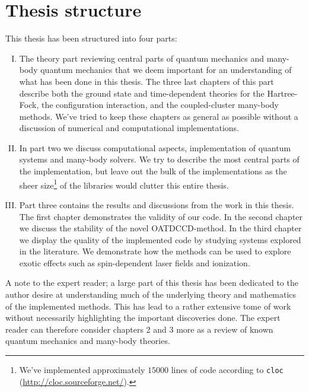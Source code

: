     \section{Thesis structure}
        This thesis has been structured into four parts:
        \begin{enumerate}[I.]
            \item The theory part reviewing central parts of quantum mechanics
                and many-body quantum mechanics that we deem important for an
                understanding of what has been done in this thesis.
                The three last chapters of this part describe both the ground
                state and time-dependent theories for the Hartree-Fock, the
                configuration interaction, and the coupled-cluster many-body
                methods.
                We've tried to keep these chapters as general as possible
                without a discussion of numerical and computational
                implementations.
            \item In part two we discuss computational aspects, implementation
                of quantum systems and many-body solvers.
                We try to describe the most central parts of the implementation,
                but leave out the bulk of the implementations as the sheer
                size\footnote{%
                    We've implemented approximately $15000$ lines of code
                    according to \texttt{cloc}
                    (\url{http://cloc.sourceforge.net/}).
                }
                of the libraries would clutter this entire thesis.
            \item Part three contains the results and discussions from the work
                in this thesis.
                The first chapter demonstrates the validity of our code.
                In the second chapter we discuss the stability of the novel
                OATDCCD-method.
                In the third chapter we display the quality of the implemented
                code by studying systems explored in the literature.
                We demonstrate how the methods can be used to explore exotic
                effects such as spin-dependent laser fields and ionization.
        \end{enumerate}
        A note to the expert reader; a large part of this thesis has been
        dedicated to the author desire at understanding much of the underlying
        theory and mathematics of the implemented methods.
        This has lead to a rather extensive tome of work without necessarily
        highlighting the important discoveries done.
        The expert reader can therefore consider chapters 2 and 3 more as a
        review of known quantum mechanics and many-body theories.

